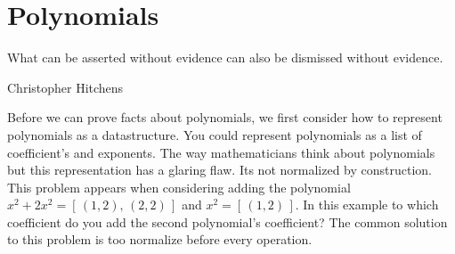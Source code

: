 \documentclass[./Thesis.tex]{subfiles}
\begin{document}
\chapter{Polynomials}
\label{chap:polynomials}

\epigraph{
  What can be asserted without evidence can also be dismissed without evidence.
}{Christopher Hitchens \cite{hitchens-quote}}

Before we can prove facts about polynomials, we first consider how to represent
polynomials as a datastructure. You could represent polynomials as a list of
coefficient's and exponents. The way mathematicians think about polynomials but
this representation has a glaring flaw. Its not normalized by construction. This
problem appears when considering adding the polynomial
$x^2 + 2x^2 = [ \, (1, 2), \, (2, 2) \, ]$ 
and $x^2 = [ \, (1, 2) \, ]$. In this example to which coefficient do you add
the second polynomial's coefficient? The common solution to this problem is too
normalize before every operation. 

\end{document}
